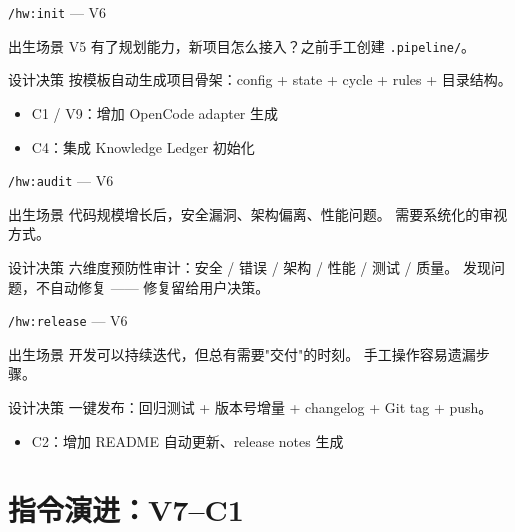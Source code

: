 \documentclass[theme=workflow,aspectratio=169,fontset=tech]{Hypo-Slide}
\begin{document}
\begin{frame}{\texttt{/hw:init} — V6}
  \begin{block}{出生场景}
    V5 有了规划能力，新项目怎么接入？之前手工创建 \texttt{.pipeline/}。
  \end{block}
  \begin{block}{设计决策}
    按模板自动生成项目骨架：config + state + cycle + rules + 目录结构。
  \end{block}
  \begin{itemize}
    \item C1 / V9：增加 OpenCode adapter 生成
    \item C4：集成 Knowledge Ledger 初始化
  \end{itemize}
\end{frame}

\begin{frame}{\texttt{/hw:audit} — V6}
  \begin{block}{出生场景}
    代码规模增长后，安全漏洞、架构偏离、性能问题。
    需要系统化的审视方式。
  \end{block}
  \begin{block}{设计决策}
    六维度预防性审计：安全 / 错误 / 架构 / 性能 / 测试 / 质量。
    发现问题，不自动修复 —— 修复留给用户决策。
  \end{block}
\end{frame}

\begin{frame}{\texttt{/hw:release} — V6}
  \begin{block}{出生场景}
    开发可以持续迭代，但总有需要"交付"的时刻。
    手工操作容易遗漏步骤。
  \end{block}
  \begin{block}{设计决策}
    一键发布：回归测试 + 版本号增量 + changelog + Git tag + push。
  \end{block}
  \begin{itemize}
    \item C2：增加 README 自动更新、release notes 生成
  \end{itemize}
\end{frame}

\section{指令演进：V7--C1}
\end{document}
